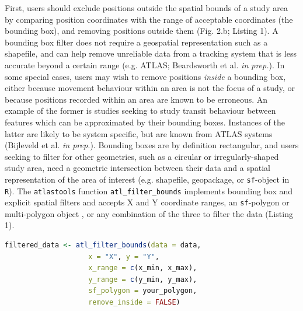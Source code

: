 \documentclass[10pt,paper=a4,headings=standardclasses
]{scrartcl}
\begin{document}
First, users should exclude positions outside the spatial bounds of a study area by comparing position coordinates with the range of acceptable coordinates (the bounding box), and removing positions outside them (Fig. 2.b; Listing 1). 
A bounding box filter does not require a geospatial representation such as a shapefile, and can help remove unreliable data from a tracking system that is less accurate beyond a certain range (e.g. ATLAS; Beardsworth et al. \textit{in prep.}).
In some special cases, users may wish to remove positions \textit{inside} a bounding box, either because movement behaviour within an area is not the focus of a study, or because positions recorded within an area are known to be erroneous.
An example of the former is studies seeking to study transit behaviour between features which can be approximated by their bounding boxes. 
Instances of the latter are likely to be system specific, but are known from ATLAS systems (Bijleveld et al. \textit{in prep.}). 
Bounding boxes are by definition rectangular, and users seeking to filter for other geometries, such as a circular or irregularly-shaped study area, need a geometric intersection between their data and a spatial representation of the area of interest (e.g. shapefile, geopackage, or \texttt{sf}-object in \texttt{R}).
The \texttt{atlastools} function \texttt{atl\_filter\_bounds} implements bounding box and explicit spatial filters and accepts X and Y coordinate ranges, an \texttt{sf}-polygon or multi-polygon object \citep{pebesma2018}, or any combination of the three to filter the data (Listing 1).

\begin{lstlisting}[float,floatplacement=h!,language=R, style=customR, caption = {
    The \texttt{atl\_filter\_bounds} function removes positions outside an area defined by coordinate ranges, a polygon, or all three (\texttt{remove\_inside = FALSE}), or positions inside the area (\texttt{remove\_inside = TRUE}).
    The arguments \texttt{x} and \texttt{y} determine the X and Y coordinate columns, \texttt{x\_range} and \texttt{y\_range} are the filter bounds in a CRS in metres, and the data can be filtered by an \texttt{sf-(MULTI)POLYGON} can be passed using the \texttt{sf\_polygon} argument. 
    \texttt{atl\_filter\_bounds} returns a filtered \texttt{data.table}, which must be saved as an object (here, \texttt{filtered\_data}).}]
filtered_data <- atl_filter_bounds(data = data,
                    x = "X", y = "Y",
                    x_range = c(x_min, x_max),
                    y_range = c(y_min, y_max),
                    sf_polygon = your_polygon,
                    remove_inside = FALSE)
\end{lstlisting}
\end{document}
